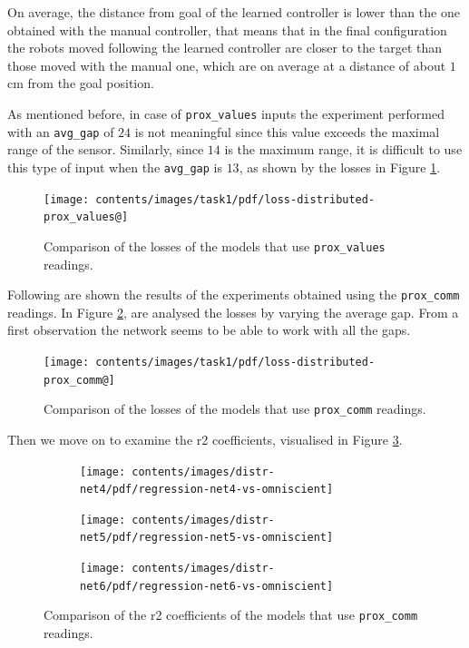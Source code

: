 On average, the distance from goal of the learned controller is lower than the one 
obtained with the manual controller, that means that in the final configuration 
the robots moved following the learned controller are closer to the target than 
those moved with the manual one, which are on average at a distance of about 
$1$ \gls{cm} from the goal position. 

As mentioned before, in case of \texttt{prox\_values} inputs the 
experiment performed with an \texttt{avg\_gap} of $24$ is not meaningful since 
this value exceeds the maximal range of the sensor. Similarly, since $14$ is the 
maximum range, it is difficult to use this type of input when the \texttt{avg\_gap}  
is $13$, as shown by the losses in Figure \ref{fig:distlossprox_values}.
\begin{figure}[!htb]
	\centering
	\texttt{[image: contents/images/task1/pdf/loss-distributed-prox\_values@]}%
	\caption{Comparison of the losses of the models that use \texttt{prox\_values} 
		readings.}
	\label{fig:distlossprox_values}
\end{figure}

Following are shown the results of the experiments obtained using the 
\texttt{prox\_comm} readings. In Figure \ref{fig:distlossprox_comm}, are 
analysed the losses by varying the average gap. From a first observation the 
network seems to be able to work with all the gaps.
\begin{figure}[!htb]
	\centering
	\texttt{[image: contents/images/task1/pdf/loss-distributed-prox\_comm@]}%
	\caption{Comparison of the losses of the models that use \texttt{prox\_comm} 
	readings.}
	\label{fig:distlossprox_comm}
\end{figure}

Then we move on to examine the \gls{r2} coefficients, visualised in Figure 
\ref{fig:net456r2}.
\begin{figure}[!htb]
	\begin{center}
		\begin{subfigure}[h]{0.47\textwidth}
			\texttt{[image: contents/images/distr-net4/pdf/regression-net4-vs-omniscient]}%
		\end{subfigure}
		\hfill
		\begin{subfigure}[h]{0.47\textwidth}
			\texttt{[image: contents/images/distr-net5/pdf/regression-net5-vs-omniscient]}%
		\end{subfigure}
	\end{center}
	\begin{center}
		\begin{subfigure}[h]{0.47\textwidth}
			\texttt{[image: contents/images/distr-net6/pdf/regression-net6-vs-omniscient]}
		\end{subfigure}
	\end{center}
	\caption[Comparison of the \gls{r2} coefficients for \texttt{prox\_comm} 
	readings.]{Comparison of the \gls{r2} coefficients of the models that use 
	\texttt{prox\_comm} readings.}
	\label{fig:net456r2}
\end{figure}


